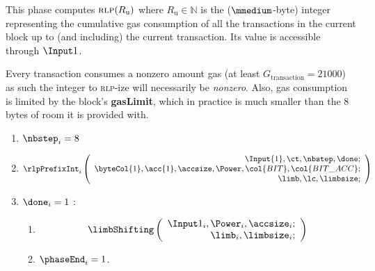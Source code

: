\begin{center}
\end{center}

This phase computes $\textsc{rlp}(R_\text{u})$ where $R_\text{u} \in \mathbb{N}$  is the ($\mmedium$-byte) integer representing the cumulative gas consumption of all the transactions in the current block up to (and including) the current transaction. Its value is accessible through $\Input 1$.

\saNote{}
Every transaction consumes a nonzero amount gas (at least $G_\text{transaction} = 21000$) as such the integer to \textsc{rlp}-ize will necessarily be \emph{nonzero}.
Also, gas consumption is limited by the block's \textbf{gasLimit}, which in practice is much smaller than the $8$ bytes of room it is provided with.

\begin{enumerate}
    \item $\nbstep_{i} = 8$
    \item
        \[
            \rlpPrefixInt_{i}
            \left(
            \begin{array}{r}
                \Input{1},
                \ct,
                \nbstep,
                \done; \\
                \byteCol{1},
                \acc{1},
                \accsize,
                \Power,
                \col{BIT},
                \col{BIT\_ACC}; \\
                \limb,
                \lc,
                \limbsize; \\
            \end{array}
            \right)
        \]
    \item \If $\done_{i}=1$ \Then:
    \begin{enumerate}
        \item \[
    \limbShifting
    \left(
    \begin{array}{r}
        \Input 1_{i},
        \Power_{i},
        \accsize_{i}; \\
        \limb_{i},
        \limbsize_{i}; \\
    \end{array}
    \right)
\]
        \item $\phaseEnd_{i}=1$.  
    \end{enumerate} 
\end{enumerate}
